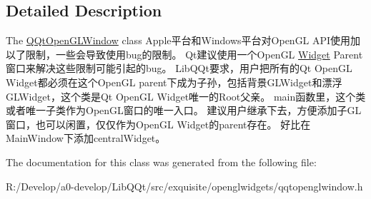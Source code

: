 \subsection{Detailed Description}
The \mbox{\hyperlink{class_q_qt_open_g_l_window}{Q\+Qt\+Open\+G\+L\+Window}} class Apple平台和\+Windows平台对\+Open\+GL A\+P\+I使用加以了限制，一些会导致使用bug的限制。 Qt建议使用一个\+Open\+GL \mbox{\hyperlink{class_widget}{Widget}} Parent窗口来解决这些限制可能引起的bug。 Lib\+Q\+Qt要求，用户把所有的\+Qt Open\+GL Widget都必须在这个\+Open\+GL parent下成为子孙，包括背景\+G\+L\+Widget和漂浮\+G\+L\+Widget，这个类是\+Qt Open\+GL Widget唯一的\+Root父亲。 main函数里，这个类或者唯一子类作为\+Open\+G\+L窗口的唯一入口。 建议用户继承下去，方便添加子\+G\+L窗口，也可以闲置，仅仅作为\+Open\+GL Widget的parent存在。 好比在\+Main\+Window下添加central\+Widget。 

The documentation for this class was generated from the following file\+:\begin{DoxyCompactItemize}
\item 
R\+:/\+Develop/a0-\/develop/\+Lib\+Q\+Qt/src/exquisite/openglwidgets/qqtopenglwindow.\+h\end{DoxyCompactItemize}
